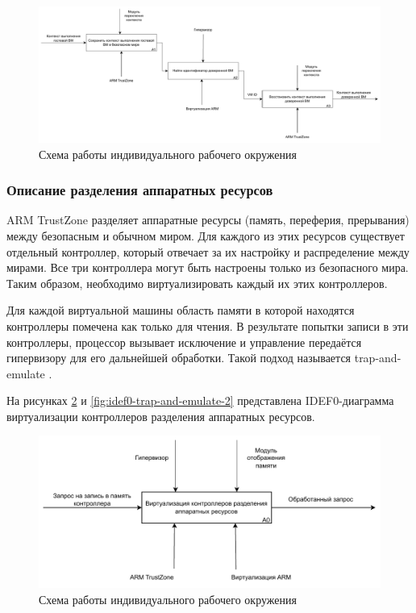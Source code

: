 \begin{figure}[h]
	\centering
	\includegraphics[width=\textwidth]{img/idef0-context-switch-2.pdf}
	\caption{Схема работы индивидуального рабочего окружения}
	\label{fig:idef0-context-switch-2}
\end{figure}

\subsubsection{Описание разделения аппаратных ресурсов}

ARM TrustZone разделяет аппаратные ресурсы (память, переферия, прерывания) между безопасным и обычном миром. Для каждого из этих ресурсов существует отдельный контроллер, который отвечает за их настройку и распределение между мирами. Все три контроллера могут быть настроены только из безопасного мира. Таким образом, необходимо виртуализировать каждый их этих контроллеров.

Для каждой виртуальной машины область памяти в которой находятся контроллеры помечена как только для чтения. В результате попытки записи в эти контроллеры, процессор вызывает исключение и управление передаётся гипервизору для его дальнейшей обработки. Такой подход называется trap-and-emulate \cite{trap-and-emulate}. 

На рисунках \ref{fig:idef0-trap-and-emulate-1} и \ref{fig:idef0-trap-and-emulate-2} представлена IDEF0-диаграмма виртуализации контроллеров разделения аппаратных ресурсов. 

\begin{figure}[h]
	\centering
	\includegraphics[width=\textwidth]{img/idef0-trap-and-emulate-1.pdf}
	\caption{Схема работы индивидуального рабочего окружения}
	\label{fig:idef0-trap-and-emulate-1}
\end{figure}

